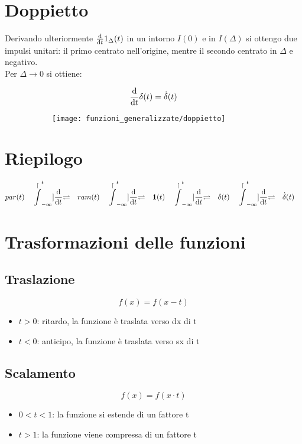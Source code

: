 \documentclass[../main.tex]{subfiles}
\begin{document}
	\section{Doppietto}
		Derivando ulteriormente $\frac{\mathrm{d} }{\mathrm{d} t}1_{\Delta}(t)$ in un intorno $I(0)$ e in $I(\Delta)$ si ottengo due impulsi unitari: il primo centrato nell'origine, mentre il secondo centrato in $\Delta$ e negativo.\\
		Per $\Delta \longrightarrow 0$ si ottiene:
		\begin{figure}[h!]
			\centering
			\begin{subfigure}{0.5\textwidth}
				\[
					\frac{\mathrm{d} }{\mathrm{d} t} \delta(t) = \dot{\delta}(t)
				\]
			\end{subfigure}
			\begin{subfigure}{0.4\textwidth}
				\texttt{[image: funzioni\_generalizzate/doppietto]}
			\end{subfigure}
		\end{figure}
		\newpage
		
	\section{Riepilogo}
		\[
			par(t) \quad \stackrel[\int_{-\infty}^{t}]{\frac{\mathrm{d} }{\mathrm{d} t}}{\rightleftharpoons} 
			\quad ram(t) \quad
			\stackrel[\int_{-\infty}^{t}]{\frac{\mathrm{d} }{\mathrm{d} t}}{\rightleftharpoons}
			\quad \textbf{1}(t) \quad
			\stackrel[\int_{-\infty}^{t}]{\frac{\mathrm{d} }{\mathrm{d} t}}{\rightleftharpoons}
			\quad \delta (t) \quad
			\stackrel[\int_{-\infty}^{t}]{\frac{\mathrm{d} }{\mathrm{d} t}}{\rightleftharpoons}
			\quad \dot{\delta}(t) \quad
		\]
		
	\section{Trasformazioni delle funzioni}
	
	\subsection{Traslazione}
		$$ f(x) = f(x - t) $$
		\begin{itemize}
			\item $ t>0 $: ritardo, la funzione è traslata verso dx di t
			\item $ t<0 $: anticipo, la funzione è traslata verso sx di t 	
		\end{itemize}
		
	\subsection{Scalamento}
		$$ f(x) = f(x \cdot t) $$
		\begin{itemize}
			\item $ 0<t<1 $: la funzione si estende di un fattore t
			\item $ t>1 $: la funzione viene compressa di un fattore t  	
		\end{itemize}
		
\end{document}
